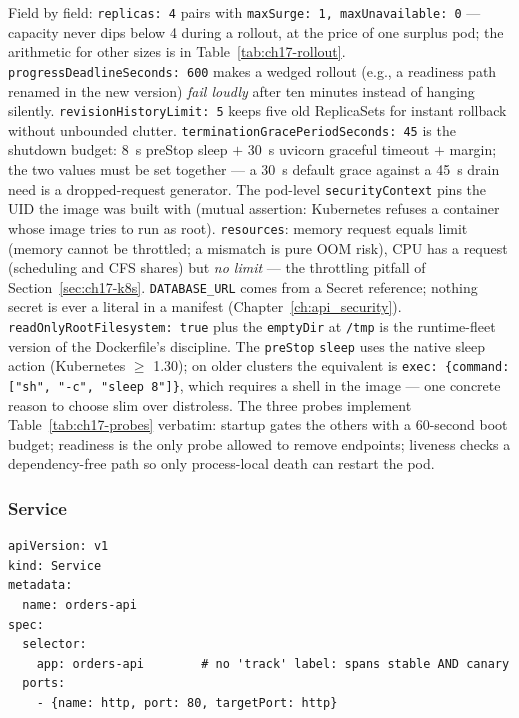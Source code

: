 Field by field: \texttt{replicas: 4} pairs with \texttt{maxSurge: 1,
maxUnavailable: 0} --- capacity never dips below 4 during a rollout, at
the price of one surplus pod; the arithmetic for other sizes is in
Table~\ref{tab:ch17-rollout}. \texttt{progressDeadlineSeconds: 600} makes
a wedged rollout (e.g., a readiness path renamed in the new version)
\emph{fail loudly} after ten minutes instead of hanging silently.
\texttt{revisionHistoryLimit: 5} keeps five old ReplicaSets for instant
rollback without unbounded clutter. \texttt{terminationGracePeriodSeconds:
45} is the shutdown budget: 8~s preStop sleep $+$ 30~s uvicorn graceful
timeout $+$ margin; the two values must be set together --- a 30~s
default grace against a 45~s drain need is a dropped-request generator.
The pod-level \texttt{securityContext} pins the UID the image was built
with (mutual assertion: Kubernetes refuses a container whose image tries
to run as root). \texttt{resources}: memory request equals limit (memory
cannot be throttled; a mismatch is pure OOM risk), CPU has a request
(scheduling and CFS shares) but \emph{no limit} --- the throttling
pitfall of Section~\ref{sec:ch17-k8s}. \texttt{DATABASE\_URL} comes from
a Secret reference; nothing secret is ever a literal in a manifest
(Chapter~\ref{ch:api_security}). \texttt{readOnlyRootFilesystem: true}
plus the \texttt{emptyDir} at \texttt{/tmp} is the runtime-fleet version
of the Dockerfile's discipline. The \texttt{preStop} \texttt{sleep} uses
the native sleep action (Kubernetes $\ge$ 1.30); on older clusters the
equivalent is \texttt{exec: \{command: ["sh", "-c", "sleep 8"]\}}, which
requires a shell in the image --- one concrete reason to choose slim over
distroless. The three probes implement Table~\ref{tab:ch17-probes}
verbatim: startup gates the others with a 60-second boot budget;
readiness is the only probe allowed to remove endpoints; liveness checks
a dependency-free path so only process-local death can restart the pod.

\subsubsection*{Service}
\label{lst:ch17-service}

\begin{verbatim}
apiVersion: v1
kind: Service
metadata:
  name: orders-api
spec:
  selector:
    app: orders-api        # no 'track' label: spans stable AND canary
  ports:
    - {name: http, port: 80, targetPort: http}
\end{verbatim}

